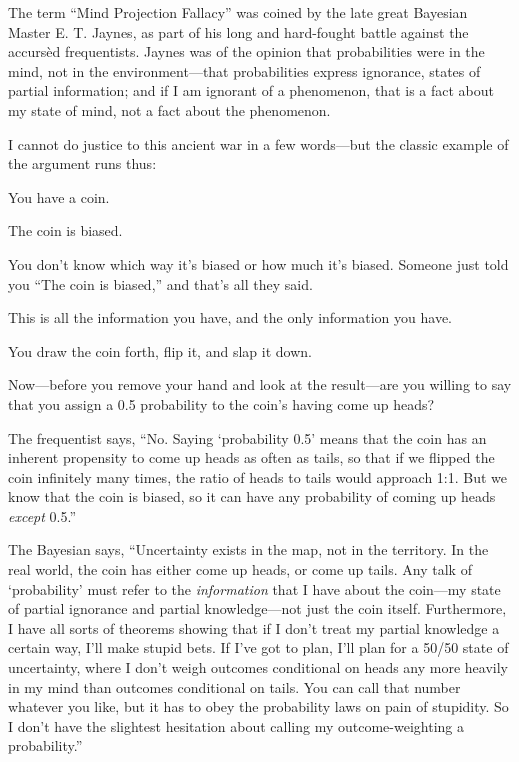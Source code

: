 {
 The term ``Mind Projection
Fallacy'' was coined by the late great Bayesian
Master E. T. Jaynes, as part of his long and hard-fought battle against
the accursèd frequentists. Jaynes was of the opinion that probabilities
were in the mind, not in the environment---that probabilities express
ignorance, states of partial information; and if I am ignorant of a
phenomenon, that is a fact about my state of mind, not a fact about the
phenomenon.}

{
 I cannot do justice to this ancient war in a few words---but the
classic example of the argument runs thus:}

{
 You have a coin.}

{
 The coin is biased.}

{
 You don't know which way it's
biased or how much it's biased. Someone just told you
``The coin is biased,'' and
that's all they said.}

{
 This is all the information you have, and the only information you
have.}

{
 You draw the coin forth, flip it, and slap it down.}

{
 Now---before you remove your hand and look at the result---are you
willing to say that you assign a 0.5 probability to the
coin's having come up heads?}

{
 The frequentist says, ``No. Saying
`probability 0.5' means that the coin
has an inherent propensity to come up heads as often as tails, so that
if we flipped the coin infinitely many times, the ratio of heads to
tails would approach 1:1. But we know that the coin is biased, so it
can have any probability of coming up heads \textit{except}
0.5.''}

{
 The Bayesian says, ``Uncertainty exists in the
map, not in the territory. In the real world, the coin has either come
up heads, or come up tails. Any talk of
`probability' must refer to the
\textit{information} that I have about the coin---my state of partial
ignorance and partial knowledge---not just the coin itself.
Furthermore, I have all sorts of theorems showing that if I
don't treat my partial knowledge a certain way,
I'll make stupid bets. If I've got to
plan, I'll plan for a 50/50 state of uncertainty, where
I don't weigh outcomes conditional on heads any more
heavily in my mind than outcomes conditional on tails. You can call
that number whatever you like, but it has to obey the probability laws
on pain of stupidity. So I don't have the slightest
hesitation about calling my outcome-weighting a
probability.''}

